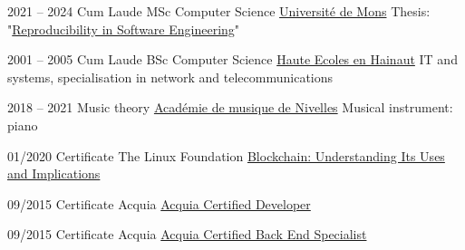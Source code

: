 
\begin{minipage}[t]{.48\textwidth}

    \begin{entrylist}
		\entry
			{\tiny{2021 -- 2024}}
            {Cum Laude}
			{MSc Computer Science}
            {\href{https://www.umons.be/}{Université de Mons}}
			{Thesis: "\href{https://doi.org/10.5281/zenodo.12666898}{Reproducibility in Software Engineering}}"
	\end{entrylist}

	\begin{entrylist}
		\entry
			{\tiny{2001 -- 2005}}
            {Cum Laude}
			{BSc Computer Science}
            {\href{https://www.heh.be/}{Haute Ecoles en Hainaut}}
			{IT and systems, specialisation in network and telecommunications}
	\end{entrylist}

	\begin{entrylist}
		\entry
			{\tiny{2018 -- 2021}}
            {}
			{Music theory}
            {\href{https://academiedenivelles.be/}{Académie de musique de Nivelles}}
			{Musical instrument: piano}
	\end{entrylist}
\end{minipage}
\hfill
\begin{minipage}[t]{.48\textwidth}
	\cvsect{Certificates}

	\begin{entrylist}
		\entry
			{01/2020}
            {}
			{Certificate}
			{The Linux Foundation}
			{\href{https://courses.edx.org/certificates/01fdb9d9242546e8bc45153468dfd785}{Blockchain: Understanding Its Uses and Implications}}
	\end{entrylist}

	\begin{entrylist}
		\entry
			{09/2015}
            {}
			{Certificate}
			{Acquia}
			{\href{https://certification.acquia.com/user/249}{Acquia Certified Developer}}
	\end{entrylist}

	\begin{entrylist}
		\entry
			{09/2015}
            {}
			{Certificate}
			{Acquia}
			{\href{https://certification.acquia.com/user/249}{Acquia Certified Back End Specialist}}
	\end{entrylist}
\end{minipage}


